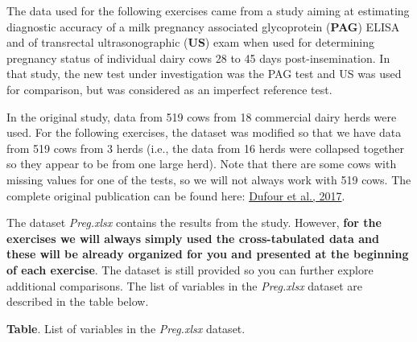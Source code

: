 \documentclass[
]{book}
\begin{document}
The data used for the following exercises came from a study aiming at
estimating diagnostic accuracy of a milk pregnancy associated
glycoprotein (\textbf{PAG}) ELISA and of transrectal ultrasonographic
(\textbf{US}) exam when used for determining pregnancy status of
individual dairy cows 28 to 45 days post-insemination. In that study,
the new test under investigation was the PAG test and US was used for
comparison, but was considered as an imperfect reference test.

In the original study, data from 519 cows from 18 commercial dairy herds
were used. For the following exercises, the dataset was modified so that
we have data from 519 cows from 3 herds (i.e., the data from 16 herds
were collapsed together so they appear to be from one large herd). Note
that there are some cows with missing values for one of the tests, so we
will not always work with 519 cows. The complete original publication
can be found here:
\href{https://www.sciencedirect.com/science/article/pii/S016758771630527X?casa_token=jmHY9HiOdEYAAAAA:kGdiIujRzrAQjjFRbGqtUxIBalDGvXllp6ja9w4T2s6c7yPbgc0asnak79bJ5GWWXI8InhCg0sg}{Dufour
et al., 2017}.

The dataset \emph{Preg.xlsx} contains the results from the study.
However, \textbf{for the exercises we will always simply used the
cross-tabulated data and these will be already organized for you and
presented at the beginning of each exercise}. The dataset is still
provided so you can further explore additional comparisons. The list of
variables in the \emph{Preg.xlsx} dataset are described in the table
below.

\textbf{Table}. List of variables in the \emph{Preg.xlsx} dataset.
\end{document}
